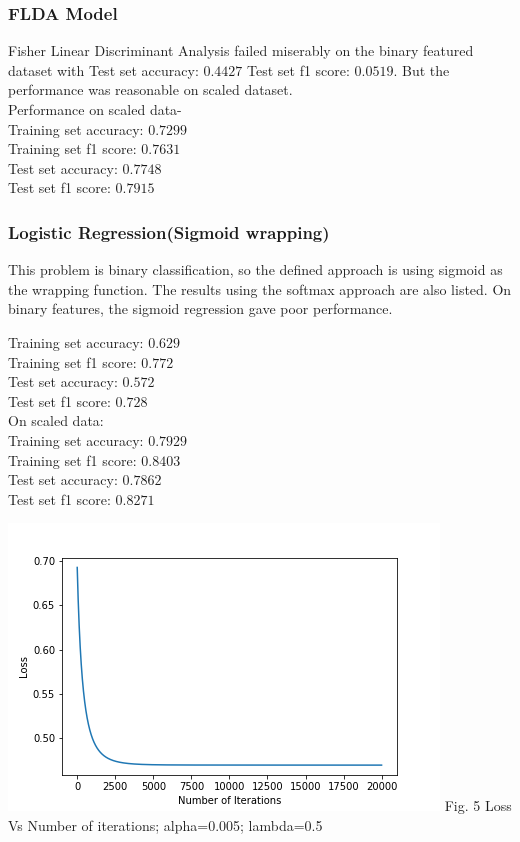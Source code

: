 \documentclass[12pt,journal,compsoc]{IEEEtran}
\begin{document}
\subsubsection{FLDA Model}
\noindent Fisher Linear Discriminant Analysis failed miserably on the binary featured dataset with Test set accuracy: $0.4427$
Test set f1 score: $0.0519$. But the performance was reasonable on scaled dataset.\\
Performance on scaled data-\\ 
Training set accuracy: $0.7299$\\
Training set f1 score: $0.7631$\\
Test set accuracy: $0.7748$\\
Test set f1 score: $0.7915$\\
\subsubsection{Logistic Regression(Sigmoid wrapping)}
\noindent This problem is binary classification, so the defined approach is using sigmoid as the wrapping function. The results using the softmax approach are also listed. On binary features, the sigmoid regression gave poor performance.

Training set accuracy: $0.629$\\
Training set f1 score: $0.772$\\
Test set accuracy: $0.572$\\
Test set f1 score: $0.728$\\
On scaled data:\\
Training set accuracy: $0.7929$\\
Training set f1 score: $0.8403$\\
Test set accuracy: $0.7862$\\
Test set f1 score: $0.8271$\\
\begin{center}
\includegraphics[scale=0.50]{report/logistic_loss20000.png}
{\small Fig. 5 Loss Vs Number of iterations; alpha=0.005; lambda=0.5}
\end{center}
\end{document}
